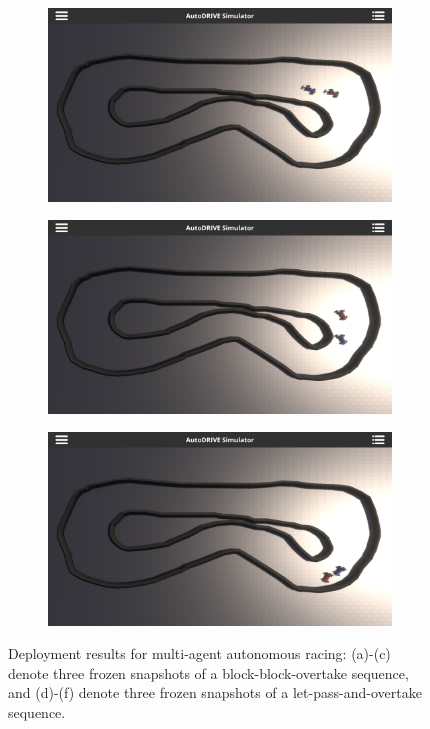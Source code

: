 \documentclass[letterpaper, 10 pt, conference]{ieeeconf}  %
\begin{document}
\begin{figure}[t]
\begin{subfigure}[b]{0.16\linewidth}
			\caption{}
			\label{fig10c}
		\end{subfigure}
		\hfill
		\begin{subfigure}[b]{0.16\linewidth}
			\centering
			\includegraphics[width=\linewidth]{Fig10d.png}
			\caption{}
			\label{fig10d}
		\end{subfigure}
		\hfill
		\begin{subfigure}[b]{0.16\linewidth}
			\centering
			\includegraphics[width=\linewidth]{Fig10e.png}
			\caption{}
			\label{fig10e}
		\end{subfigure}
		\hfill
		\begin{subfigure}[b]{0.16\linewidth}
			\centering
			\includegraphics[width=\linewidth]{Fig10f.png}
			\caption{}
			\label{fig10f}
		\end{subfigure}
		\caption{Deployment results for multi-agent autonomous racing: (a)-(c) denote three frozen snapshots of a block-block-overtake sequence, and (d)-(f) denote three frozen snapshots of a let-pass-and-overtake sequence.}
		\label{fig10}
	\end{figure}
	
\end{document}
